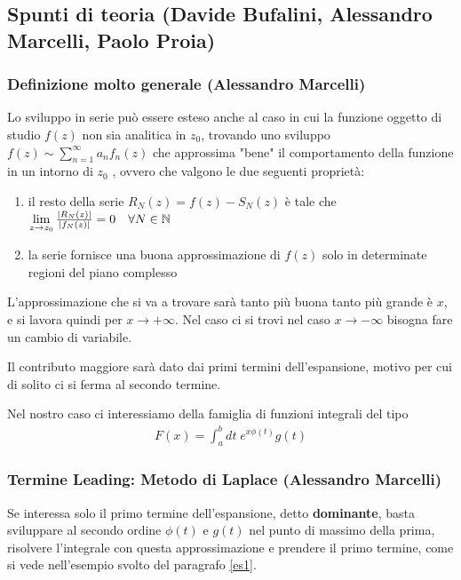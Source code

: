 \subsection{Spunti di teoria (Davide Bufalini, Alessandro Marcelli, Paolo Proia)}

\subsubsection{Definizione molto generale (Alessandro Marcelli)}

Lo sviluppo in serie può essere esteso anche al caso in cui la funzione oggetto di studio $f(z)$ non sia analitica in $z_0$, trovando uno sviluppo $f(z) \sim \sum_{n=1}^{\infty} a_n f_n(z)$ che approssima "bene" il comportamento della funzione in un intorno di $z_0$ \cite{MMF}, ovvero che valgono le due seguenti proprietà:
\begin{enumerate}
	\item il resto della serie $R_N(z) = f(z) - S_N(z)$ è tale che $\underset{z \rightarrow z_0}{\lim} \, \frac{|R_N(z)|}{|f_N(z)|} = 0 \quad \forall N\in \mathbb{N}$
	\item la serie fornisce una buona approssimazione di $f(z)$ solo in determinate regioni del piano complesso
\end{enumerate}
L'approssimazione che si va a trovare sarà tanto più buona tanto più grande è $x$, e si lavora quindi per $x \to + \infty$. Nel caso ci si trovi nel caso $x \to -\infty$ bisogna fare un cambio di variabile.

Il contributo maggiore sarà dato dai primi termini dell'espansione, motivo per cui di solito ci si ferma al secondo termine.

Nel nostro caso ci interessiamo della famiglia di funzioni integrali del tipo
\begin{align}
	F(x) = \int_{a}^{b} dt \; e^{x\phi(t)}g(t) \label{lol0}
\end{align}

\subsubsection{Termine Leading: Metodo di Laplace (Alessandro Marcelli)}

Se interessa solo il primo termine dell'espansione, detto \textbf{dominante}, basta sviluppare al secondo ordine $\phi(t)$ e $g(t)$ nel punto di massimo della prima, risolvere l'integrale con questa approssimazione e prendere il primo termine, come si vede nell'esempio svolto del paragrafo \ref{es1}.

